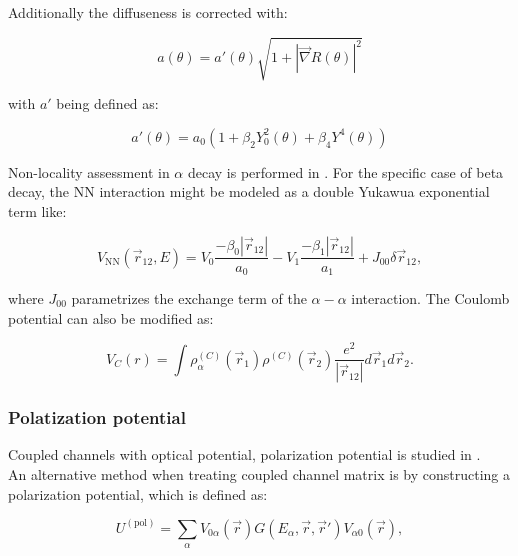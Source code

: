 \documentclass[openany]{book}
\begin{document}
Additionally the diffuseness is corrected with:

 \begin{equation}\label{potential_nonLocal_modifiedWoodsSaxon_a}
	a(\theta) = a'(\theta) \sqrt{1 + |\vec \nabla R(\theta)|^2 }
\end{equation}

with $a'$ being defined as:

 \begin{equation}\label{potential_nonLocal_modifiedWoodsSaxon_aprime}
	a'(\theta) = a_0 \left(1 + \beta_2 Y^{2}_{0}(\theta) + \beta_4Y^{4}(\theta)\right)
\end{equation}

Non-locality assessment in $\alpha$ decay is performed in \cite{perez_velasquez_kelkar_upadhyay_2019}. For the specific case of beta decay, the NN interaction might be modeled as a double Yukawua exponential term like: 

\begin{equation}\label{potential_nonLocal_M3Y}
	V_{\mathrm{NN}}(\vec r_{12}, E) = V_0 \frac{-\beta_0 |\vec r_{12}|}{a_0} - V_1 \frac{-\beta_1 |\vec r_{12}|}{a_1} + J_{00}\delta{\vec r_{12}},
\end{equation}

where $J_{00}$ parametrizes the exchange term of the $\alpha-\alpha$ interaction. The Coulomb potential can also be modified as: 

\begin{equation}\label{potential_nonLocal_coulomb}
	V_{C}(r) = \int \rho^{(C)}_\alpha(\vec r_1) \rho^{(C)}(\vec r_2) \frac{e^2}{|\vec r_{12}|} d\vec r_1 d\vec r_2.
\end{equation}


\subsubsection{Polatization potential}

Coupled channels with optical potential,  polarization potential is studied in \cite{cardenas_canto_donangelo_hussein_lubian_romanelli_2002}. \\ 

An alternative method when treating coupled channel matrix is by constructing a polarization potential, which is defined as: 

\begin{equation}\label{eq:potential_polatization}
	U^{(\mathrm{pol})} = \sum_\alpha {V_{0\alpha} (\vec r) G(E_\alpha, \vec r, \vec r') V_{\alpha0} (\vec r)},
\end{equation}
\end{document}
